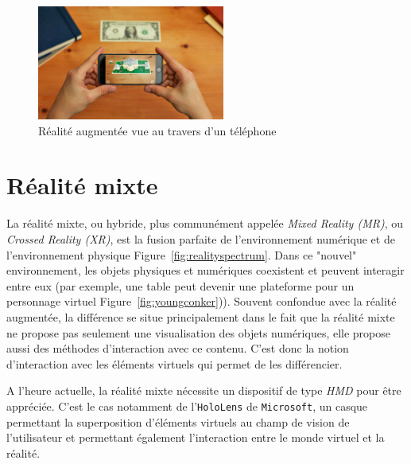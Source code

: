 \begin{figure}[H]
\centering
\includegraphics[width=0.55\textwidth]{images/AR}
\caption{Réalité augmentée vue au travers d'un téléphone\protect\footnotemark}\label{fig:AR}
\end{figure}

\section{Réalité mixte}
\label{sec:MR}
La réalité mixte, ou hybride, plus communément appelée \emph{Mixed Reality (MR)}, ou \emph{Crossed Reality (XR)}, est la fusion parfaite de l'environnement numérique et de l'environnement physique Figure~\ref{fig:realityspectrum}. Dans ce "nouvel" environnement, les objets physiques et numériques coexistent et peuvent interagir entre eux (par exemple, une table peut devenir une plateforme pour un personnage virtuel Figure~\ref{fig:youngconker})). Souvent confondue avec la réalité augmentée, la différence se situe principalement dans le fait que la réalité mixte ne propose pas seulement une visualisation des objets numériques, elle propose aussi des méthodes d'interaction avec ce contenu. C'est donc la notion d'interaction avec les éléments virtuels qui permet de les différencier. 

A l'heure actuelle, la réalité mixte nécessite un dispositif de type \emph{HMD} pour être appréciée. C'est le cas notamment de l'\texttt{HoloLens} de \texttt{Microsoft}, un casque permettant la superposition d'éléments virtuels au champ de vision de l'utilisateur et permettant également l'interaction entre le monde virtuel et la réalité.

